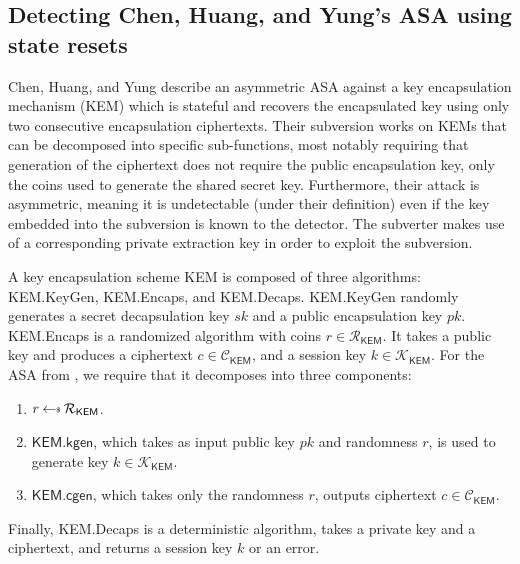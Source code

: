\subsection{Detecting Chen, Huang, and Yung's ASA using state resets} \label{sec:attackasas:chen}

Chen, Huang, and Yung \cite{AC:CheHuaYun20} describe an asymmetric ASA against a key encapsulation mechanism (KEM) which is stateful and recovers the encapsulated key using only two consecutive encapsulation ciphertexts. Their subversion works on KEMs that can be decomposed into specific sub-functions, most notably requiring that generation of the ciphertext does not require the public encapsulation key, only the coins used to generate the shared secret key. Furthermore, their attack is asymmetric, meaning it is undetectable (under their definition) even if the key embedded into the subversion is known to the detector. The subverter makes use of a corresponding private extraction key in order to exploit the subversion.

A key encapsulation scheme \textsf{KEM} is composed of three algorithms: \textsf{KEM.KeyGen}, \textsf{KEM.Encaps}, and \textsf{KEM.Decaps}. \textsf{KEM.KeyGen} randomly generates a secret decapsulation key $sk$ and a public encapsulation key $pk$. \textsf{KEM.Encaps} is a randomized algorithm with coins $r\in \mathcal{R}_\mathsf{KEM}$. It takes a public key and produces a ciphertext $c\in \mathcal{C}_\mathsf{KEM}$, and a session key $k\in \mathcal{K}_\mathsf{KEM}$. For the ASA from \cite{AC:CheHuaYun20}, we require that it decomposes into three components:
\begin{enumerate}\itemsep0em
\item $r\sample \mathcal{R}_\mathsf{KEM}$.
\item $\mathsf{KEM.kgen}$, which takes as input public key $pk$ and randomness $r$, is used to generate key $k\in \mathcal{K}_\mathsf{KEM}$.
\item $\mathsf{KEM.cgen}$, which takes only the randomness $r$, outputs ciphertext $c\in \mathcal{C}_\mathsf{KEM}$.
\end{enumerate}
Finally, \textsf{KEM.Decaps} is a deterministic algorithm, takes a private key and a ciphertext, and returns a session key $k$ or an error.

